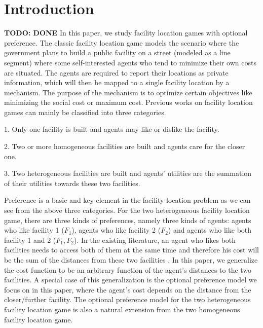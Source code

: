 \documentclass[twoside,11pt]{article}
\newcommand{\todo}[1]{}
\renewcommand{\todo}[1]{{\textbf{\color{red} TODO: {#1}}}}
\begin{document}
\section{Introduction}
\todo{DONE}
In this paper, we study facility location games with optional preference. The classic facility location game models the scenario where the government plans to build a public facility on a street (modeled as a line segment) where some self-interested agents who tend to minimize their own costs are situated. The agents are required to report their locations as private information, which will then be mapped to a single facility location by a mechanism. The purpose of the mechanism is to optimize certain objectives like minimizing the social cost or maximum cost. Previous works on facility location games can mainly be classified into three categories.

1. Only one facility is built and agents may like or dislike the facility.

2. Two or more homogeneous facilities are built and agents care for the closer one.

3. Two heterogeneous facilities are built and agents' utilities are the summation of their utilities towards these two facilities.

Preference is a basic and key element in the facility location problem as we can see from the above three categories. For the two heterogeneous facility location game, there are three kinds of preferences, namely three kinds of agents: agents who like facility 1 ($F_{1}$), agents who like facility 2 ($F_{2}$) and agents who like both facility 1 and 2 ($F_{1},F_{2}$). In the existing literature, an agent who likes both facilities needs to access both of them at the same time and therefore his cost will be the sum of the distances from these two facilities \cite{serafino2015truthful}. In this paper, we generalize the cost function to be an arbitrary function of the agent's distances to the two facilities. A special case of this generalization is the optional preference model we focus on in this paper, where the agent's cost depends on the distance from the closer/further facility. The optional preference model for the two heterogeneous facility location game is also a natural extension from the two homogeneous facility location game.
\end{document}
